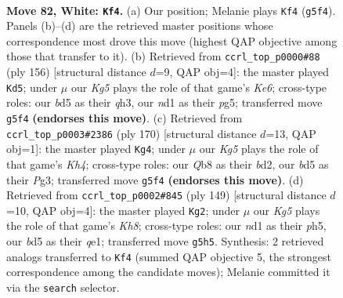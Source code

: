 \documentclass[11pt]{article}
\begin{document}
\clearpage

\begin{figure}[p]\centering
\begin{subfigure}{0.46\textwidth}\centering
\resizebox{\linewidth}{!}{%
\newchessgame
\chessboard[
  setfen={1Q6/P5k1/8/3b2K1/8/8/8/3n4 w - - 1 82},
  showmover=false,
  pgfstyle=straightmove, color=movearrow, markmove={g5-f4}
]}
\caption{}
\end{subfigure}\hfill
\begin{subfigure}{0.46\textwidth}\centering
\resizebox{\linewidth}{!}{%
\newchessgame
\chessboard[
  setfen={4k3/1Q6/P3K3/6p1/8/7q/8/8 w - - 11 79},
  showmover=false,
  pgfstyle=straightmove, color=movearrow, markmove={e6-d5}
]}
\caption{}
\end{subfigure}
\\[4pt]
\begin{subfigure}{0.46\textwidth}\centering
\resizebox{\linewidth}{!}{%
\newchessgame
\chessboard[
  setfen={8/3B4/5k2/8/7K/5PP1/3b4/8 w - - 63 86},
  showmover=false,
  pgfstyle=straightmove, color=movearrow, markmove={h4-g4}
]}
\caption{}
\end{subfigure}\hfill
\begin{subfigure}{0.46\textwidth}\centering
\resizebox{\linewidth}{!}{%
\newchessgame
\chessboard[
  setfen={2K5/8/8/7P/2p5/3q4/8/4Q2k b - - 2 75},
  showmover=false,
  pgfstyle=straightmove, color=movearrow, markmove={h1-g2}
]}
\caption{}
\end{subfigure}
\caption{\textbf{Move 82, White: \texttt{Kf4}.} (a) Our position; Melanie plays \texttt{Kf4} (\texttt{g5f4}). Panels (b)--(d) are the retrieved master positions whose correspondence most drove this move (highest QAP objective among those that transfer to it). (b) Retrieved from \texttt{ccrl\_top\_p0000\#88} (ply 156) [structural distance $d$=9, QAP obj=4]: the master played \texttt{Kd5}; under $\mu$ our \emph{Kg5} plays the role of that game's \emph{Ke6}; cross-type roles: our \emph{b}d5 as their \emph{q}h3, our \emph{n}d1 as their \emph{p}g5; transferred move \texttt{g5f4} \textbf{(endorses this move)}. (c) Retrieved from \texttt{ccrl\_top\_p0003\#2386} (ply 170) [structural distance $d$=13, QAP obj=1]: the master played \texttt{Kg4}; under $\mu$ our \emph{Kg5} plays the role of that game's \emph{Kh4}; cross-type roles: our \emph{Q}b8 as their \emph{b}d2, our \emph{b}d5 as their \emph{P}g3; transferred move \texttt{g5f4} \textbf{(endorses this move)}. (d) Retrieved from \texttt{ccrl\_top\_p0002\#845} (ply 149) [structural distance $d$=10, QAP obj=4]: the master played \texttt{Kg2}; under $\mu$ our \emph{Kg5} plays the role of that game's \emph{Kh8}; cross-type roles: our \emph{n}d1 as their \emph{p}h5, our \emph{b}d5 as their \emph{q}e1; transferred move \texttt{g5h5}. Synthesis: 2 retrieved analogs transferred to \texttt{Kf4} (summed QAP objective 5, the strongest correspondence among the candidate moves); Melanie committed it via the \texttt{search} selector.}
\label{fig:thought-m162}
\end{figure}
\end{document}
